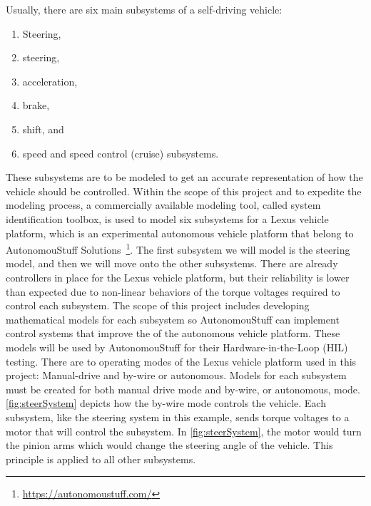 \documentclass[letterpaper,12pt]{article}   %
\begin{document}
\vspace*{12pt}

\noindent Usually, there are six main subsystems of a self-driving vehicle: %
%
\begin{enumerate}
\item  Steering,
  
\item steering,
  
\item acceleration,
  
\item brake,
  
\item shift, and 
  
\item speed and speed control
  (cruise) subsystems.
\end{enumerate}
%
These subsystems are to be modeled to get an accurate representation of how
the vehicle should be controlled. Within the scope of this project and to expedite the modeling process, a commercially available modeling tool, called system identification toolbox, is used to model six subsystems for a Lexus vehicle platform, which is an experimental autonomous vehicle platform that belong to AutonomouStuff Solutions~\footnote{\url{https://autonomoustuff.com/}}. The first subsystem we will model is the steering model, and then we will move onto
the other subsystems. There are already controllers in place for the Lexus
vehicle platform, but their reliability is lower than expected due to non-linear
behaviors of the torque voltages required to control each subsystem. The scope
of this project includes developing mathematical models for each subsystem so
AutonomouStuff can implement control systems that improve the  of the
autonomous vehicle platform. These models will be used by AutonomouStuff for
their Hardware-in-the-Loop (HIL) testing.  There are to operating modes of the Lexus vehicle platform used in this project: Manual-drive and by-wire or autonomous. Models for each subsystem must be created
for both manual drive mode and by-wire, or autonomous, mode.
\autoref{fig:steerSystem} depicts how the by-wire mode controls the vehicle. Each
subsystem, like the steering system in this example, sends torque voltages to a
motor that will control the subsystem. In \autoref{fig:steerSystem}, the motor would
turn the pinion arms which would change the steering angle of the vehicle. This
principle is applied to all other subsystems.
\end{document}

